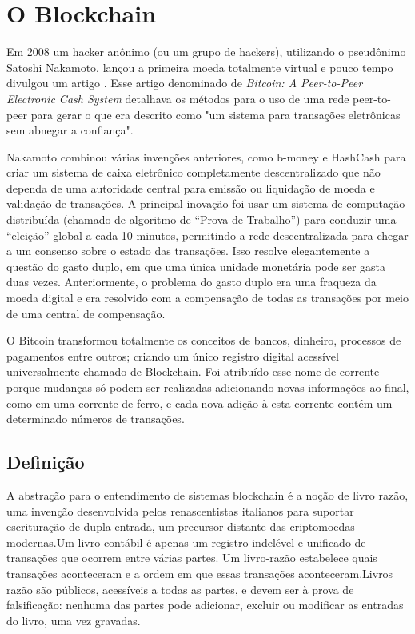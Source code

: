    
\section{O Blockchain}

    
    Em 2008 um hacker anônimo (ou um grupo de hackers), utilizando o pseudônimo Satoshi Nakamoto, lançou a primeira moeda totalmente virtual e pouco tempo divulgou um artigo \cite{bitcoin_satoshi}. Esse artigo denominado de \textit{Bitcoin: A Peer-to-Peer Electronic Cash System} detalhava os métodos para o uso de uma rede peer-to-peer para gerar o que era descrito como "um sistema para transações eletrônicas sem abnegar a confiança".
    
    Nakamoto combinou várias invenções anteriores, como b-money e HashCash para criar um sistema de caixa eletrônico completamente descentralizado que não dependa de uma autoridade central para emissão ou liquidação de moeda e validação de transações. A principal inovação foi usar um sistema de computação distribuída (chamado de algoritmo de “Prova-de-Trabalho”) para conduzir uma “eleição” global a cada 10 minutos, permitindo a rede descentralizada para chegar a um consenso sobre o estado das transações. Isso resolve elegantemente a questão do gasto duplo, em que uma única unidade monetária pode ser gasta duas vezes. Anteriormente, o problema do gasto duplo era uma fraqueza da moeda digital e era resolvido com a compensação de todas as transações por meio de uma central de compensação.\cite{mastering_blockchain_andreas}
    
    O Bitcoin transformou totalmente os conceitos de bancos, dinheiro, processos de pagamentos entre outros; criando um único registro digital acessível universalmente chamado de Blockchain. Foi atribuído esse nome de corrente porque mudanças só podem ser realizadas adicionando novas informações ao final, como em uma corrente de ferro, e cada nova adição à esta corrente contém um determinado números de transações.



    \subsection{Definição}
    
    A abstração para o entendimento de sistemas blockchain é a noção de livro razão, uma invenção desenvolvida pelos renascentistas italianos para suportar escrituração de dupla entrada, um precursor distante das criptomoedas modernas.Um livro contábil é apenas um registro indelével e unificado de transações que ocorrem entre várias partes. Um livro-razão estabelece quais transações aconteceram e a ordem em que essas transações aconteceram.Livros razão são públicos, acessíveis a todas as partes, e devem ser à prova de falsificação: nenhuma das partes pode adicionar, excluir ou modificar as entradas do livro, uma vez gravadas.\cite{blockchain_computing_perspective}
    
